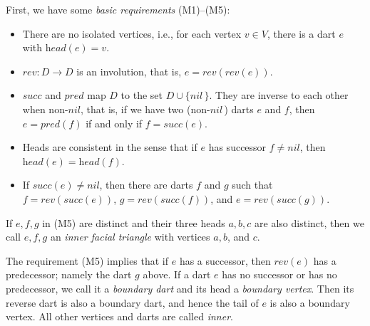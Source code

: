 \documentclass[10pt,a4paper]{article}
\def\nil{\textit{nil}}
\def\head{\textit{head}}
\def\reverse{\textit{rev}}
\def\successor{\textit{succ}}
\def\predecessor{\textit{pred}}
\begin{document}
First, we have some \emph{basic requirements} (M1)--(M5):
\begin{itemize}
     \item[(M1)] There are no isolated vertices, i.e., for each vertex $v\in V$, there is a dart $e$ with $\head(e)=v$.  
     \item[(M2)] $\reverse: D\to D$ is an involution, that is, $e=\reverse(\reverse(e))$.
    \item[(M3)] $\successor$ and $\predecessor$ map $D$ to the set $D\cup\{\nil\,\}$. They are inverse to each other when non-$\nil$, that is, if we have two (non-$\nil$\,) darts $e$ and $f$, then
    $e=\predecessor(f)$ if and only if $f=\successor(e)$.
    \item[(M4)] Heads are consistent in the sense that if $e$ has successor $f\ne\nil$, then $\head(e)=\head(f)$.
    \item[(M5)] If $\successor(e) \ne \nil$, then there are darts $f$ and $g$ such that $f=\reverse(\successor(e))$, $g=\reverse(\successor(f))$, and $e=\reverse(\successor(g))$. 
\end{itemize}
If $e,f,g$ in (M5) are distinct and their three heads $a,b,c$ are also distinct, then we call $e,f,g$ an \emph{inner facial triangle} with vertices $a,b$, and $c$.

The requirement (M5) 
implies that if $e$ has a successor, then
$\reverse(e)$ has a predecessor; namely the dart $g$ above. If a dart $e$ has no successor or has no predecessor, we call it a \emph{boundary dart} and its head a \emph{boundary vertex}.
Then its reverse dart is also a boundary dart, and hence the tail of $e$ is also a boundary vertex. All other vertices and darts are called \emph{inner}. 
\end{document}
